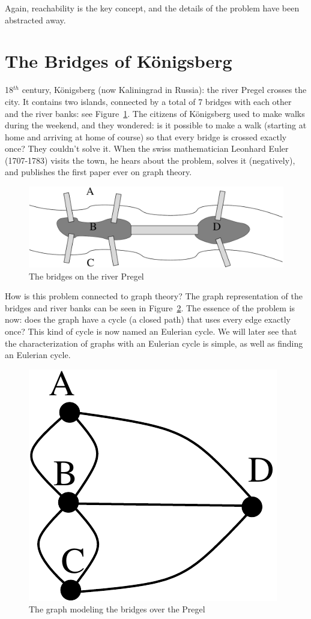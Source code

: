 Again, reachability is the key concept, and the details of the problem
have been abstracted away.


\section{The Bridges of K\"onigsberg}

18$^{th}$ century, K\"onigsberg (now Kaliningrad in Russia): the river Pregel
crosses the city. It contains two islands, connected by a total of 7
bridges with each other and the river banks: see
Figure~\ref{pregel}. The citizens of K\"onigsberg used to make walks
during the weekend, and they wondered: is it possible to make a walk
(starting at home and arriving at home of course) so that every bridge
is crossed exactly once? They couldn't solve it. When the swiss
mathematician Leonhard Euler (1707-1783) visits the town, he hears
about the problem, solves it (negatively), and publishes the first
paper ever on graph theory.

\begin{figure}[ht]
	\centering
	\includegraphics[width=0.4\linewidth,keepaspectratio]{pregel}
	\caption{The bridges on the river Pregel \label{pregel}}
\end{figure}

How is this problem connected to graph theory? The graph
representation of the bridges and river banks can be seen in
Figure~\ref{pregelgraph}. The essence of the problem is now: does the
graph have a cycle (a closed path) that uses every edge exactly once?
This kind of cycle is now named an Eulerian cycle. We will later see
that the characterization of graphs with an Eulerian cycle is simple,
as well as finding an Eulerian cycle.

\begin{figure}[ht]
	\centering
	\includegraphics[width=0.15\linewidth,keepaspectratio]{pregelgraph}
	\caption{The graph modeling the bridges over the Pregel \label{pregelgraph}}
\end{figure}

